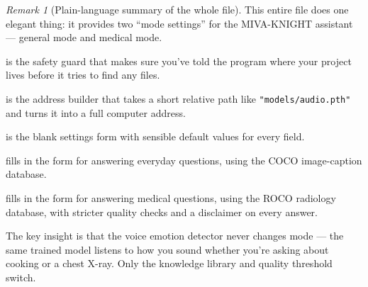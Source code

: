 \documentclass[12pt,a4paper]{article}
\theoremstyle{definition}
\theoremstyle{remark}
\newtheorem{remark}[theorem]{Remark}
\begin{document}
\begin{remark}[Plain-language summary of the whole file]
This entire file does one elegant thing: it provides two ``mode settings''
for the MIVA-KNIGHT assistant — general mode and medical mode.
\begin{description}[leftmargin=1.5cm]
  \item[\texttt{\_root()}] is the safety guard that makes sure you've told
    the program where your project lives before it tries to find any files.
  \item[\texttt{\_p()}] is the address builder that takes a short relative
    path like \texttt{"models/audio.pth"} and turns it into a full computer
    address.
  \item[\texttt{DomainConfig}] is the blank settings form with sensible
    default values for every field.
  \item[\texttt{GeneralDomain}] fills in the form for answering everyday questions,
    using the COCO image-caption database.
  \item[\texttt{MedicalDomain}] fills in the form for answering medical questions,
    using the ROCO radiology database, with stricter quality checks and
    a disclaimer on every answer.
\end{description}
The key insight is that the voice emotion detector never changes mode —
the same trained model listens to how you sound whether you're asking
about cooking or a chest X-ray.
Only the knowledge library and quality threshold switch.
\end{remark}
\end{document}
